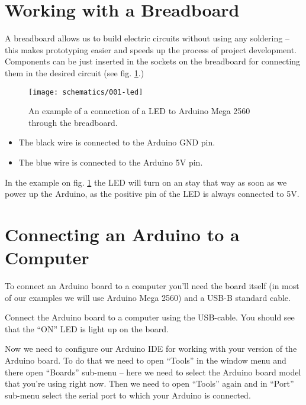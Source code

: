 \documentclass[../sparc.tex]{subfiles}
\begin{document}
\section{Working with a Breadboard}


A breadboard allows us to build electric circuits without using any soldering --
this makes prototyping easier and speeds up the process of project development.
Components can be just inserted in the sockets on the breadboard for connecting
them in the desired circuit (see fig. \ref{fig:breadboard-led}.)

\begin{figure}[ht]
  \centering
  \texttt{[image: schematics/001-led]}
  \caption{An example of a connection of a LED to Arduino Mega 2560 through the
    breadboard.}
  \label{fig:breadboard-led}
\end{figure}

\begin{itemize}
\item The black wire is connected to the Arduino GND pin.
\item The blue wire is connected to the Arduino 5V pin.
\end{itemize}


In the example on fig. \ref{fig:breadboard-led} the LED will turn on an stay
that way as soon as we power up the Arduino, as the positive pin of the LED is
always connected to 5V.

\section{Connecting an Arduino to a Computer}
To connect an Arduino board to a computer you'll need the board itself (in most
of our examples we will use Arduino Mega 2560) and a USB-B standard cable.

Connect the Arduino board to a computer using the USB-cable.  You should see
that the ``ON'' LED is light up on the board.

Now we need to configure our Arduino \gls{IDE} for working with your version of
the Arduino board.  To do that we need to open ``Tools'' in the window menu and
there open ``Boards'' sub-menu -- here we need to select the Arduino board model
that you're using right now.  Then we need to open ``Tools'' again and in
``Port'' sub-menu select the serial port to which your Arduino is connected.


\end{document}
